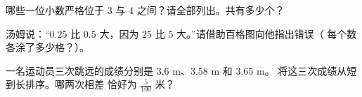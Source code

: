 \begin{exercise}[$\star$]\label{exo:g4:decimals:9}
哪些一位小数严格位于
$3$ 与 $4$ 之间？请全部列出。共有多少个？
\end{exercise}

\begin{exercise}[$\star\star$]\label{exo:g4:decimals:10}
汤姆说：“$0.25$ 比 $0.5$ 大，因为 $25$ 比
$5$ 大。”请借助百格图向他指出错误（
每个数各涂了多少格？）。
\end{exercise}

\begin{exercise}[$\star\star$]\label{exo:g4:decimals:11}
一名运动员三次跳远的成绩分别是 $3.6$ m、$3.58$ m 和 $3.65$ m。
将这三次成绩从短到长排序。哪两次相差
恰好为 $\frac{5}{100}$ 米？
\end{exercise}
